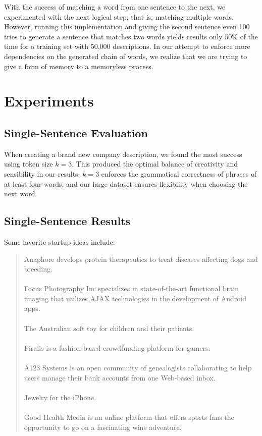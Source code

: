 \documentclass[11pt]{article}
\begin{document}
With the success of matching a word from one sentence to the next, we experimented with the next logical step; that is, matching multiple words. However, running this implementation and giving the second sentence even 100 tries to generate a sentence that matches two words yields results only 50\% of the time for a training set with 50,000 descriptions. In our attempt to enforce more dependencies on the generated chain of words, we realize that we are trying to give a form of memory to a memoryless process.

\section{Experiments}

\subsection{Single-Sentence Evaluation}

When creating a brand new company description, we found the most success using token size \(k=3\). This produced the optimal balance of creativity and sensibility in our results. \(k=3\) enforces the grammatical correctness of phrases of at least four words, and our large dataset ensures flexibility when choosing the next word.

\subsection{Single-Sentence Results}

Some favorite startup ideas include:
\begin{quote}
Anaphore develops protein therapeutics to treat diseases affecting dogs and breeding.\\\\
Focus Photography Inc specializes in state-of-the-art functional brain imaging that utilizes AJAX technologies in the development of Android apps.\\\\
The Australian soft toy for children and their patients.\\\\
Firalis is a fashion-based crowdfunding platform for gamers.\\\\
A123 Systems is an open community of genealogists collaborating to help users manage their bank accounts from one Web-based inbox.\\\\
Jewelry for the iPhone.\\\\
Good Health Media is an online platform that offers sports fans the opportunity to go on a fascinating wine adventure.
\end{quote}
\end{document}
